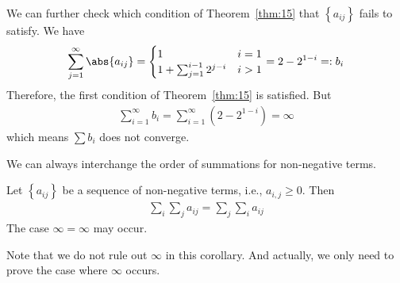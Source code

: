 \documentclass[thmcnt=section, 12pt]{elegantbook}
\begin{document}
\begin{example}
    \par We can further check which condition of Theorem~\ref{thm:15} that $\left\{a_{ij}\right\}$ fails to satisfy. We have
    \begin{align*}
        \sum_{j=1}^\infty \abs{a_{ij}}
        = \begin{cases}
            1 &i=1 \\ 
            1 + \sum_{j=1}^{i-1} 2^{j-i} &i>1
        \end{cases}
        = 2 - 2^{1-i} =: b_i
    \end{align*}
    Therefore, the first condition of Theorem~\ref{thm:15} is satisfied. But 
    \begin{align*}
        \sum_{i=1}^\infty b_i
        = \sum_{i=1}^\infty (2 - 2^{1-i})
        = \infty
    \end{align*}
    which means $\sum b_i$ does not converge.
\end{example}


\par We can always interchange the order of summations for non-negative terms.

\begin{corollary}
    Let $\left\{a_{ij}\right\}$ be a sequence of non-negative terms, i.e., $a_{i,j} \geq 0$. Then 
    \begin{align*}
        \sum_{i} \sum_{j} a_{ij} 
        = \sum_{j} \sum_{i} a_{ij} 
    \end{align*}
    The case $\infty = \infty$ may occur.
\end{corollary}

\begin{remark}
    Note that we do not rule out $\infty$ in this corollary. And actually, we only need to prove the case where $\infty$ occurs.
\end{remark}
\end{document}
